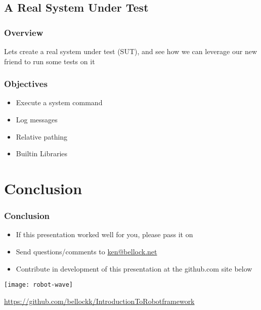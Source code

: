 \documentclass[xcolor=table,handout]{beamer}
\begin{document}
\subsection{A Real System Under Test}

\begin{frame}\frametitle{Overview}
    Lets create a real system under test (SUT), and see how we can leverage our new friend to run some tests on it
\end{frame}

\begin{frame}\frametitle{Objectives}
    \begin{itemize}
        \item Execute a system command
        \item Log messages
        \item Relative pathing
        \item Builtin Libraries
    \end{itemize}
\end{frame}

\section{Conclusion}

\begin{frame}\frametitle{Conclusion}
    \begin{itemize}
        \item If this presentation worked well for you, please pass it on
        \item Send questions/comments to \href{mailto:ken@bellock.net}{ken@bellock.net}
        \item Contribute in development of this presentation at the github.com site below
    \end{itemize}
    \begin{center}
    \texttt{[image: robot-wave]}

    \footnotesize\url{https://github.com/bellockk/IntroductionToRobotframework}
    \end{center}
\end{frame}
\end{document}
